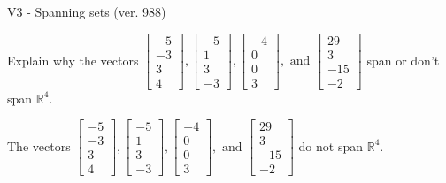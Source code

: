 \begin{exercise}
  \begin{exerciseTitle}V3 - Spanning sets (ver. 988)\end{exerciseTitle}
  \begin{exerciseStatement}
    Explain why the vectors \(\left[\begin{array}{r}
-5 \\
-3 \\
3 \\
4
\end{array}\right] , \left[\begin{array}{r}
-5 \\
1 \\
3 \\
-3
\end{array}\right] , \left[\begin{array}{r}
-4 \\
0 \\
0 \\
3
\end{array}\right] , \text{ and } \left[\begin{array}{r}
29 \\
3 \\
-15 \\
-2
\end{array}\right]\) span or don't span \(\mathbb{R}^4\). 
	


  \end{exerciseStatement}
  \begin{exerciseAnswer}
   The vectors \(\left[\begin{array}{r}
-5 \\
-3 \\
3 \\
4
\end{array}\right] , \left[\begin{array}{r}
-5 \\
1 \\
3 \\
-3
\end{array}\right] , \left[\begin{array}{r}
-4 \\
0 \\
0 \\
3
\end{array}\right] , \text{ and } \left[\begin{array}{r}
29 \\
3 \\
-15 \\
-2
\end{array}\right]\) 
  	 do not  
	span \(\mathbb{R}^4\).
  


  \end{exerciseAnswer}
\end{exercise}